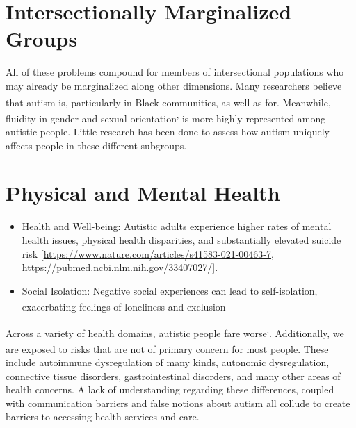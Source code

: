 \documentclass[
  letterpaper,
  DIV=11,
  numbers=noendperiod]{scrreprt}
\providecommand{\tightlist}{%
  \setlength{\itemsep}{0pt}\setlength{\parskip}{0pt}}\usepackage{longtable,booktabs,array}
\begin{document}
\section{Intersectionally Marginalized Groups}\label{sec-marginalized}

All of these problems compound for members of intersectional populations
who may already be marginalized along other dimensions. Many researchers
believe that autism is\textsuperscript{},
particularly in Black
communities\textsuperscript{}, as well as
for\textsuperscript{}. Meanwhile, fluidity
in gender and sexual
orientation\textsuperscript{,}
is more highly represented among autistic people. Little research has
been done to assess how autism uniquely affects people in these
different subgroups.

\section{Physical and Mental Health}\label{sec-physical_mental_health}

\begin{itemize}
\tightlist
\item
  Health and Well-being: Autistic adults experience higher rates of
  mental health issues, physical health disparities, and substantially
  elevated suicide risk
  {[}\url{https://www.nature.com/articles/s41583-021-00463-7},
  \url{https://pubmed.ncbi.nlm.nih.gov/33407027/}{]}.
\item
  Social Isolation: Negative social experiences can lead to
  self-isolation, exacerbating feelings of loneliness and
  exclusion\textsuperscript{}
\end{itemize}

Across a variety of health domains, autistic people fare
worse\textsuperscript{,}.
Additionally, we are exposed to risks that are not of primary concern
for most people\textsuperscript{}. These
include autoimmune dysregulation of many kinds, autonomic dysregulation,
connective tissue disorders, gastrointestinal disorders, and many other
areas of health concerns. A lack of understanding regarding these
differences, coupled with communication barriers and false notions about
autism all collude to create barriers to accessing health services and
care.
\end{document}
